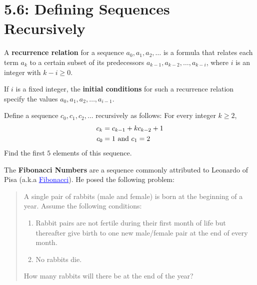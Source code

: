 \documentclass[../mathNotesPreamble]{subfiles}
\providecommand{\relscalefact}{1.4}
\begin{document}
\relscale{\relscalefact}
  \section{5.6: Defining Sequences Recursively}

  \begin{defn*}
    A \textbf{recurrence relation} for a sequence $a_0, a_1, a_2,\dots$ is a formula that relates each term $a_k$ to a certain subset of its predecessors $a_{k-1}, a_{k-2}, \dots, a_{k-i}$, where $i$ is an integer with $k-i\geq 0$.

    If $i$ is a fixed integer, the \textbf{initial conditions} for such a recurrence relation specify the values $a_0, a_1, a_2, \dots, a_{i-1}$.
  \end{defn*}
  \begin{ex*}
    Define a sequence $c_0, c_1, c_2, \dots$ recursively as follows: For every integer $k\geq 2$,
    \begin{align*}
      c_k&=c_{k-1}+k c_{k-2}+1\\
      c_0&=1 \textnormal{ and } c_1=2
    \end{align*}
    Find the first $5$ elements of this sequence.
  \end{ex*}
  \pagebreak

  \begin{ex*}
    The \textbf{Fibonacci Numbers} are a sequence commonly attributed to Leonardo of Pisa (a.k.a \href{https://en.wikipedia.org/wiki/Fibonacci}{\textcolor{blue}{\underline{Fibonacci}}}). He posed the following problem:
    \begin{quote}
      A single pair of rabbits (male and female) is born at the beginning of a year. Assume the following conditions:
      \begin{enumerate}
        \item Rabbit pairs are not fertile during their first month of life but thereafter give birth to one new male/female pair at the end of every month.
        \item No rabbits die.
      \end{enumerate}
      How many rabbits will there be at the end of the year?
    \end{quote}
  \end{ex*}
  \pagebreak
\end{document}
